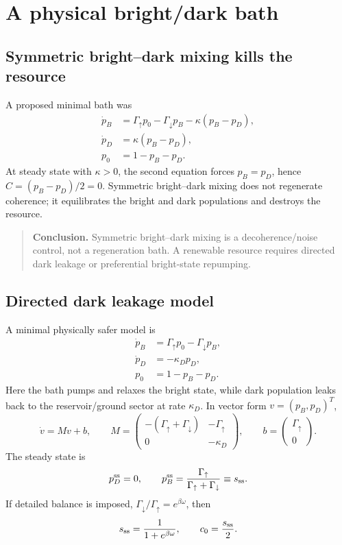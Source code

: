 \documentclass[11pt,a4paper]{article}
\newenvironment{resultbox}{\begin{quote}\small\color{blue!40!black}}{\end{quote}}
\begin{document}
\section{A physical bright/dark bath}\label{sec:bath}

\subsection{Symmetric bright--dark mixing kills the resource}

A proposed minimal bath was
\begin{align}
\dot p_B&=\Gamma_\uparrow p_0-\Gamma_\downarrow p_B-\kappa(p_B-p_D),\\
\dot p_D&=\kappa(p_B-p_D),\\
p_0&=1-p_B-p_D.
\end{align}
At steady state with $\kappa>0$, the second equation forces $p_B=p_D$, hence $C=(p_B-p_D)/2=0$. Symmetric bright--dark mixing does not regenerate coherence; it equilibrates the bright and dark populations and destroys the resource.

\begin{resultbox}
\textbf{Conclusion.} Symmetric bright--dark mixing is a decoherence/noise control, not a regeneration bath. A renewable resource requires directed dark leakage or preferential bright-state repumping.
\end{resultbox}

\subsection{Directed dark leakage model}

A minimal physically safer model is
\begin{align}
\dot p_B&=\Gamma_\uparrow p_0-\Gamma_\downarrow p_B,\\
\dot p_D&=-\kappa_D p_D,\\
p_0&=1-p_B-p_D.
\end{align}
Here the bath pumps and relaxes the bright state, while dark population leaks back to the reservoir/ground sector at rate $\kappa_D$. In vector form $v=(p_B,p_D)^T$,
\begin{equation}
\dot v=Mv+b,
\qquad
M=\begin{pmatrix}
-(\Gamma_\uparrow+\Gamma_\downarrow)&-\Gamma_\uparrow\\
0&-\kappa_D
\end{pmatrix},
\qquad
b=\begin{pmatrix}\Gamma_\uparrow\\0\end{pmatrix}.
\end{equation}
The steady state is
\begin{equation}
p_D^{\rm ss}=0,
\qquad
p_B^{\rm ss}=\frac{\Gamma_\uparrow}{\Gamma_\uparrow+\Gamma_\downarrow}\equiv s_{\rm ss}.
\end{equation}
If detailed balance is imposed, $\Gamma_\downarrow/\Gamma_\uparrow=e^{\beta\omega}$, then
\begin{equation}
s_{\rm ss}=\frac{1}{1+e^{\beta\omega}},
\qquad
c_0=\frac{s_{\rm ss}}{2}.
\end{equation}
\end{document}
